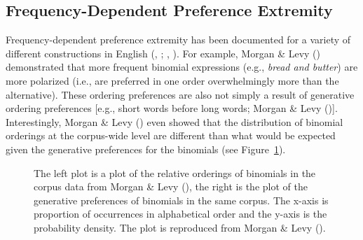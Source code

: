 \documentclass[
  12pt,
  letterpaper,
]{scrreprt}
\begin{document}
\subsection{Frequency-Dependent Preference
Extremity}\label{frequency-dependent-preference-extremity}

Frequency-dependent preference extremity has been documented for a
variety of different constructions in English
(,
;
,
).
For example, Morgan \& Levy ()
demonstrated that more frequent binomial expressions (e.g.,
\emph{bread and butter}) are more polarized (i.e., are preferred in one
order overwhelmingly more than the alternative). These ordering
preferences are also not simply a result of generative ordering
preferences {[}e.g., short words before long words; Morgan \& Levy
(){]}.
Interestingly, Morgan \& Levy
()
even showed that the distribution of binomial orderings at the
corpus-wide level are different than what would be expected given the
generative preferences for the binomials (see
Figure~\ref{fig-corpusplot1}).

\begin{figure}[htbp]

\caption{\label{fig-corpusplot1}The left plot is a plot of the relative
orderings of binomials in the corpus data from Morgan \& Levy
(), the right is the plot of the
generative preferences of binomials in the same corpus. The x-axis is
proportion of occurrences in alphabetical order and the y-axis is the
probability density. The plot is reproduced from Morgan \& Levy
().}


\end{figure}%
\end{document}
